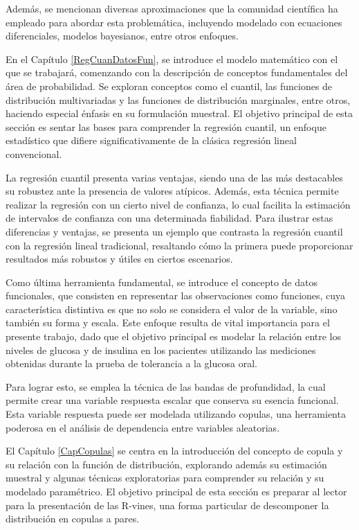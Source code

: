 Además, se mencionan diversas aproximaciones que la comunidad científica ha empleado para abordar esta problemática, incluyendo modelado con ecuaciones diferenciales, modelos bayesianos, entre otros enfoques.

En el Capítulo \ref{RegCuanDatosFun}, se introduce el modelo matemático con el que se trabajará, comenzando con la descripción de conceptos fundamentales del área de probabilidad. Se exploran conceptos como el cuantil, las funciones de distribución multivariadas y las funciones de distribución marginales, entre otros, haciendo especial énfasis en su formulación muestral. El objetivo principal de esta sección es sentar las bases para comprender la regresión cuantil, un enfoque estadístico que difiere significativamente de la clásica regresión lineal convencional.

La regresión cuantil presenta varias ventajas, siendo una de las más destacables su robustez ante la presencia de valores atípicos. Además, esta técnica permite realizar la regresión con un cierto nivel de confianza, lo cual facilita la estimación de intervalos de confianza con una determinada fiabilidad. Para ilustrar estas diferencias y ventajas, se presenta un ejemplo que contrasta la regresión cuantil con la regresión lineal tradicional, resaltando cómo la primera puede proporcionar resultados más robustos y útiles en ciertos escenarios.


Como última herramienta fundamental, se introduce el concepto de datos funcionales, que consisten en representar las observaciones como funciones, cuya característica distintiva es que no solo se considera el valor de la variable, sino también su forma y escala. Este enfoque resulta de vital importancia para el presente trabajo, dado que el objetivo principal es modelar la relación entre los niveles de glucosa y de insulina en los pacientes utilizando las mediciones obtenidas durante la prueba de tolerancia a la glucosa oral.

Para lograr esto, se emplea la técnica de las bandas de profundidad, la cual permite crear una variable respuesta escalar que conserva su esencia funcional. Esta variable respuesta puede ser modelada utilizando copulas, una herramienta poderosa en el análisis de dependencia entre variables aleatorias. 

El Capítulo \ref{CapCopulas} se centra en la introducción del concepto de copula y su relación con la función de distribución, explorando además su estimación muestral y algunas técnicas exploratorias para comprender su relación y su modelado paramétrico. El objetivo principal de esta sección es preparar al lector para la presentación de las R-vines, una forma particular de descomponer la distribución en copulas a pares.

